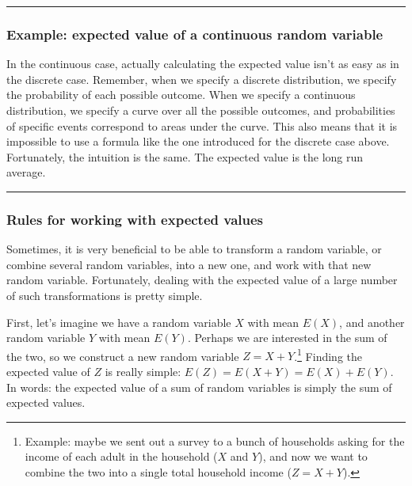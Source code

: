 \documentclass[]{book}
\let\rmarkdownfootnote\footnote%
\def\footnote{\protect\rmarkdownfootnote}
\theoremstyle{definition}
\theoremstyle{definition}
\theoremstyle{definition}
\theoremstyle{remark}
\begin{document}
\begin{center}\rule{0.5\linewidth}{\linethickness}\end{center}

\hypertarget{example-expected-value-of-a-continuous-random-variable}{%
\subsubsection{Example: expected value of a continuous random variable}\label{example-expected-value-of-a-continuous-random-variable}}

In the continuous case, actually calculating the expected value isn't as easy as in the discrete case. Remember, when we specify a discrete distribution, we specify the probability of each possible outcome. When we specify a continuous distribution, we specify a curve over all the possible outcomes, and probabilities of specific events correspond to areas under the curve. This also means that it is impossible to use a formula like the one introduced for the discrete case above. Fortunately, the intuition is the same. The expected value is the long run average.

\begin{center}\rule{0.5\linewidth}{\linethickness}\end{center}

\hypertarget{rules-for-working-with-expected-values}{%
\subsubsection{Rules for working with expected values}\label{rules-for-working-with-expected-values}}

Sometimes, it is very beneficial to be able to transform a random variable, or combine several random variables, into a new one, and work with that new random variable. Fortunately, dealing with the expected value of a large number of such transformations is pretty simple.

First, let's imagine we have a random variable \(X\) with mean \(E(X)\), and another random variable \(Y\) with mean \(E(Y)\). Perhaps we are interested in the sum of the two, so we construct a new random variable \(Z = X + Y\).\footnote{Example: maybe we sent out a survey to a bunch of households asking for the income of each adult in the household (\(X\) and \(Y\)), and now we want to combine the two into a single total household income (\(Z = X + Y\)).} Finding the expected value of \(Z\) is really simple: \(E(Z) = E(X + Y) = E(X) + E(Y)\). In words: the expected value of a sum of random variables is simply the sum of expected values.
\end{document}
